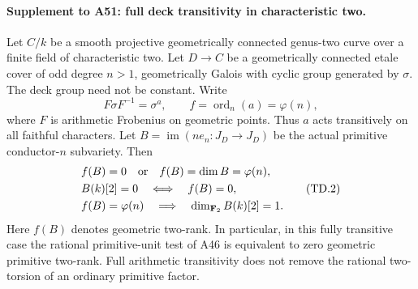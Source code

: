 \documentclass[11pt,a4paper]{article}
\begin{document}
\paragraph{Supplement to A51: full deck transitivity in characteristic two.}
Let $C/k$ be a smooth projective geometrically connected genus-two
curve over a finite field of characteristic two. Let $D\to C$ be
a geometrically connected etale cover of odd degree $n>1$,
geometrically Galois with cyclic group generated by $\sigma$.
The deck group need not be constant. Write
\[
 F\sigma F^{-1}=\sigma^a,\qquad
 f=\operatorname{ord}_n(a)=\varphi(n),
 \tag{TD.1}
\]
where $F$ is arithmetic Frobenius on geometric points.
Thus $a$ acts transitively on all faithful characters.
Let $B=\operatorname{im}(ne_n:J_D\to J_D)$ be the actual
primitive conductor-$n$ subvariety. Then
\[
\begin{aligned}
 &f(B)=0\quad\hbox{or}\quad f(B)=\dim B=\varphi(n),\\
 &B(k)[2]=0\quad\Longleftrightarrow\quad f(B)=0,\\
 &f(B)=\varphi(n)\quad\Longrightarrow\quad
                         \dim_{\mathbf F_2}B(k)[2]=1.
\end{aligned}
 \tag{TD.2}
\]
Here $f(B)$ denotes geometric two-rank. In particular, in this
fully transitive case the rational primitive-unit test of A46
is equivalent to zero geometric primitive two-rank. Full
arithmetic transitivity does not remove the rational two-torsion
of an ordinary primitive factor.
\end{document}
